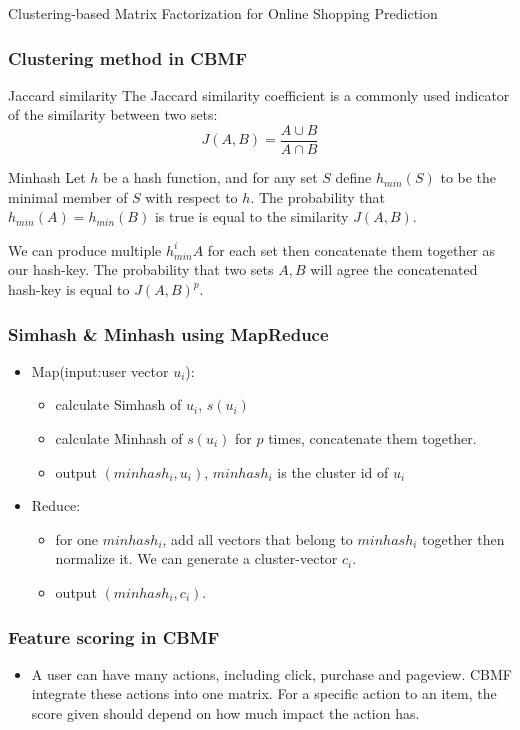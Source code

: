 \documentclass[xetex,mathserif,serif]{beamer}
\begin{document}
\begin{section}{Clustering-based Matrix Factorization for Online Shopping Prediction}
\begin{frame}
  \end{frame}
  \begin{frame}
    \frametitle{Clustering method in CBMF}
    \begin{block}
      {Jaccard similarity}
      The Jaccard similarity coefficient is a commonly used indicator of the similarity between two sets:$$J(A, B) = \frac{A \cup B}{A \cap B}$$              
    \end{block}
    \begin{block}
      {Minhash}
      Let $h$ be a hash function, and for any set $S$ define $h_{min}(S)$ to be the minimal member of $S$ with respect to $h$. The probability that $h_{min}(A) = h_{min}(B)$ is true is equal to the similarity $J(A,B)$.
    \end{block}
    We can produce multiple $h^i_{min}A$ for each set then concatenate them together as our hash-key. The probability that two sets $A,B$ will agree the concatenated hash-key is equal to $J(A,B)^p$.
  \end{frame}
  \begin{frame}
    \frametitle{Simhash \& Minhash using MapReduce}
    \begin{itemize}
    \item Map(input:user vector $u_i$):
      \begin{itemize}
      \item calculate Simhash of $u_i$, $s(u_i)$
      \item calculate Minhash of $s(u_i)$ for $p$ times, concatenate them together.
      \item output $(minhash_i, u_i)$, $minhash_i$ is the cluster id of $u_i$
      \end{itemize}
    \item Reduce:
      \begin{itemize}
      \item for one $minhash_i$, add all vectors that belong to $minhash_i$ together then normalize it. We can generate a cluster-vector $c_i$.
      \item output $(minhash_i, c_i)$.
      \end{itemize}
    \end{itemize}
  \end{frame}
  \begin{frame}
    \frametitle{Feature scoring in CBMF}
    \begin{itemize}
    \item     A user can have many actions, including click, purchase and pageview. CBMF integrate these actions into one matrix. For a specific action to an item, the score given should depend on how much impact the action has. 


\end{itemize}
\end{frame}
\end{section}
\end{document}
